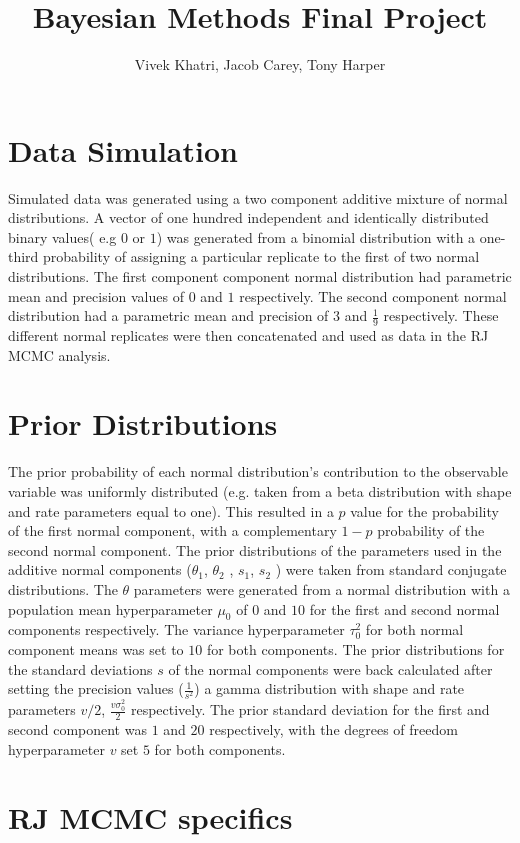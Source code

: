 \documentclass[12pt]{article}
\title{Bayesian Methods Final Project}
\author{Vivek Khatri, Jacob Carey, Tony Harper}
\date{}
\begin{document}
\section*{Data Simulation}
Simulated data was generated using a two component additive mixture of normal distributions.  A vector of one hundred independent and identically distributed binary values( e.g $0$ or $1$) was generated from a binomial distribution with a one-third probability of assigning a particular replicate to the first of two normal distributions. The first component component normal distribution had parametric mean and precision values of $0$ and $1$ respectively. The second component normal distribution had a parametric mean and precision of $3$ and $\frac{1}{9}$ respectively.
These different normal replicates were then concatenated and used as data in the RJ MCMC analysis.

\section*{Prior Distributions}
The prior probability of each normal distribution’s contribution to the observable variable was uniformly distributed (e.g. taken from a beta distribution with shape and rate parameters equal to one). This resulted in a $p$ value for the probability of the first normal component, with a complementary $1-p$ probability of the second normal component.
The prior distributions of the parameters used in the additive normal components ($\theta_1$, $\theta_2$ , $s_1$, $s_2$ ) were taken from standard conjugate distributions. The $\theta$ parameters were generated from a normal distribution with a population mean hyperparameter $\mu_0$ of $0$ and $10$ for the first and second normal components respectively. The variance hyperparameter $\tau_0^2$ for both normal component means was set to $10$ for both components.
	The prior distributions for the standard deviations $s$ of the normal components were back calculated after setting the precision values ($\frac{1}{s^2}$)  a gamma distribution with shape and rate parameters $v/2$, $\frac{v\sigma_0^2}{2}$ respectively. The prior standard deviation for the first and second component  was $1$ and $20$ respectively, with the degrees of freedom hyperparameter $v$ set $5$ for both components. 


\section*{RJ MCMC specifics}
\end{document}

